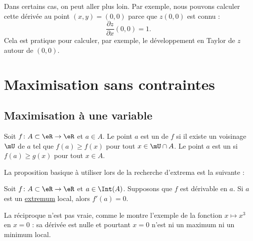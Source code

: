 Dans certains cas, on peut aller plus loin. Par exemple, nous pouvons calculer cette dérivée au point $(x,y)=(0,0)$ parce que $z(0,0)$ est connu :
\begin{equation}
	\frac{ \partial z }{ \partial x }(0,0)=1.
\end{equation}
Cela est pratique pour calculer, par exemple, le développement en Taylor de $z$ autour de $(0,0)$.


                    \section{Maximisation sans contraintes}

                    \subsection{Maximisation à une variable}

\begin{definition}
Soit $f\colon A\subset \eR\to \eR$ et $a\in A$. Le point $a$ est un  de $f$ si il existe un voisinage $\mU$ de $a$ tel que $f(a)\geq f(x)$ pour tout $x\in\mU\cap A$. Le point $a$ est un  si $f(a)\geq g(x)$ pour tout $x\in A$.
\end{definition}

La proposition basique à utiliser lors de la recherche d'extrema est la suivante :
\begin{proposition}
Soit $f\colon A\subset\eR\to \eR$ et $a\in\Int(A)$. Supposons que $f$ est dérivable en $a$. Si $a$ est un \href{http://fr.wikipedia.org/wiki/Extremum}{extremum} local, alors $f'(a)=0$.
\end{proposition}

La réciproque n'est pas vraie, comme le montre l'exemple de la fonction $x\mapsto x^3$ en $x=0$ : sa dérivée est nulle et pourtant $x=0$ n'est ni un maximum ni un minimum local. 

